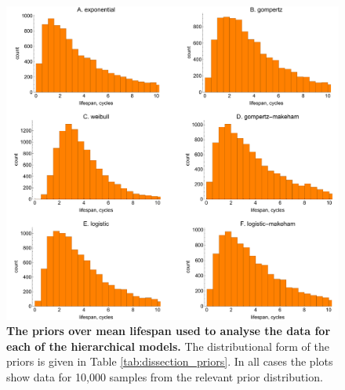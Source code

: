 \documentclass[12pt]{article}
\begin{document}
{\begin{figure}[ht]
	\centerline{\includegraphics[width=1\textwidth]{./Figure_files/dissection_lifespanPriorsParity.pdf}}
	\caption{\textbf{The priors over mean lifespan used to analyse the data for each of the hierarchical models.} The distributional form of the priors is given in Table \ref{tab:dissection_priors}. In all cases the plots show data for 10,000 samples from the relevant prior distribution.}\label{fig:dissection_lifespanPriorsParity}
\end{figure}

}
\end{document}
